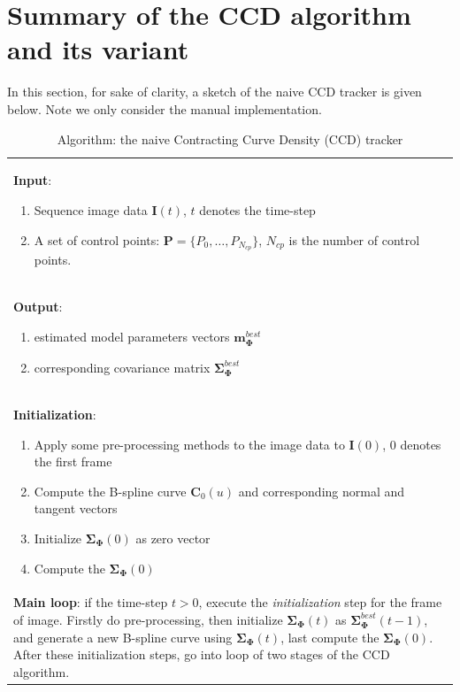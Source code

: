 \section{Summary of the CCD algorithm and its variant}
\label{sec:sccd}
In this section,  for sake of clarity, a sketch of the naive CCD
tracker is given below. Note we only consider the manual
implementation.  
\begin{table}[htbp]
  \caption{Algorithm: the naive Contracting Curve Density (CCD) tracker}
  \label{summary of CCD}
  \centering
  \begin{tabular*}{0.9\textwidth}{!{\color{red} \vrule width 4pt}l}
\textbf{Input}:\parbox{13cm}{ 
  \begin{enumerate}
  \item Sequence image data $\mathbf{I}(t)$, $t$ denotes the time-step
  \item A set of control points:  $\mathbf{P} = \{P_{0}, \ldots, P_{N_{cp}}\}$,
$N_{cp}$ is the number of control points.
  \end{enumerate}
}
\\
\textbf{Output}: 
\parbox{13cm}{
  \begin{enumerate}
  \item estimated model parameters vectors $\mathbf{m}_{\mathbf{\Phi}}^{best}$ 
  \item corresponding covariance matrix $\mathbf{\Sigma}_{\mathbf{\Phi}}^{best}$
  \end{enumerate}
}
\\
\textbf{Initialization}:\parbox{13cm}
{
  \begin{enumerate}
  \item Apply some pre-processing methods to the image data to
    $\mathbf{I}(0)$, $0$ denotes the first frame
  \item Compute the B-spline curve $\mathbf{C}_{0}(u)$ and
    corresponding normal and tangent vectors 
  \item Initialize $\mathbf{\Sigma}_{\mathbf{\Phi}}(0)$ as zero vector
  \item Compute the $\mathbf{\Sigma}_{\mathbf{\Phi}}(0)$
  \end{enumerate}
}\\
\textbf{Main loop}: 
\parbox{13cm}
{
if the time-step $t > 0$, execute the \textit{initialization} step for
the frame of image. Firstly do pre-processing, then initialize $\mathbf{\Sigma}_{\mathbf{\Phi}}(t)$ as
$\mathbf{\Sigma}_{\mathbf{\Phi}}^{best}(t-1)$, and generate a new
B-spline curve using $\mathbf{\Sigma}_{\mathbf{\Phi}}(t)$,
last compute the $\mathbf{\Sigma}_{\mathbf{\Phi}}(0)$. After these
initialization steps, go into loop of  two stages of the CCD algorithm.
}\\


\end{tabular*}
\end{table}
